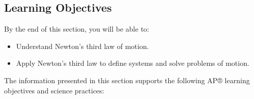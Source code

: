 \documentclass[
]{book}
\providecommand{\tightlist}{%
  \setlength{\itemsep}{0pt}\setlength{\parskip}{0pt}}
\newenvironment{learning-objectives}{}{}
\begin{document}
\hypertarget{fs-id2242736}{}
\begin{learning-objectives}

\hypertarget{learning-objectives-16}{%
\subsection{Learning Objectives}\label{learning-objectives-16}}

By the end of this section, you will be able to:

\begin{itemize}
\tightlist
\item
  Understand Newton's third law of motion.
\item
  Apply Newton's third law to define systems and solve problems of
  motion.
\end{itemize}

The information presented in this section supports the following AP®
learning objectives and science practices:


\end{learning-objectives}
\end{document}
